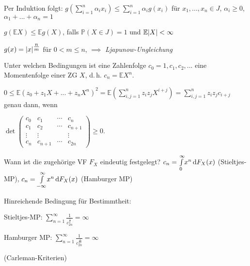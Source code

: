 \documentclass{cheat-sheet}
\renewcommand{\P}{\mathbb{P}} %
\newcommand{\E}{\mathbb{E}} %
\begin{document}
Per Induktion folgt: $g(\sum_{i=1}^n \alpha_i x_i) \leq \sum_{i=1}^n \alpha_i g(x_i)$ für $x_1, ..., x_n \in J$, $\alpha_i \geq 0$, $\alpha_1 + ... + \alpha_n = 1$

\begin{satz}
  $g(\E X) \leq \E g(X)$, falls $\P(X \in J) = 1$ und $\E \abs{X} < \infty$
\end{satz}


$g(x) = \lvert x\rvert^{\tfrac{n}{m}}$ für $0 < m \leq n$, $\implies$ \emph{Ljapunow-Ungleichung}

\begin{problem}[Momentenproblem]
  Unter welchen Bedingungen ist eine Zahlenfolge $c_0 = 1, c_1, c_2, ...$ eine Momentenfolge einer ZG $X$, d.\,h. $c_n = \E X^n$.
\end{problem}

\begin{antwort}
  $0 \leq \E(z_0 + z_1 X + ... + z_n X^n)^2 = \E(\sum_{i,j=1}^n z_i z_j X^{i+j}) = \sum_{i,j=1}^n z_i z_j c_{i+j}$ genau dann, wenn

  $\det \begin{pmatrix} c_0 & c_1 & \cdots & c_n \\ c_1 & c_2 & \cdots & c_{n+1} \\ \vdots & \vdots & & \vdots \\ c_n & c_{n+1} & \cdots & c_{2n} \end{pmatrix} \geq 0$.
\end{antwort}

\begin{problem}
  Wann ist die zugehörige VF $F_X$ eindeutig festgelegt? $c_n = {\textstyle \int\limits_{0}^{\infty}} x^n \,\mathrm{d} F_X(x)$ (Stieltjes-MP), $c_n = {\textstyle \int\limits_{-\infty}^{\infty}} x^n \,\mathrm{d} F_X(x)$ (Hamburger MP)

  Hinreichende Bedingung für Bestimmtheit:

  Stieltjes-MP: $\sum_{n=1}^\infty \frac{1}{c_{2n}^{\tfrac{1}{n}}} = \infty$

  Hamburger MP: $\sum_{n=1}^\infty \frac{1}{c_{2n}^{\tfrac{1}{2n}}} = \infty$

  (Carleman-Kriterien)
\end{problem}



\end{document}
